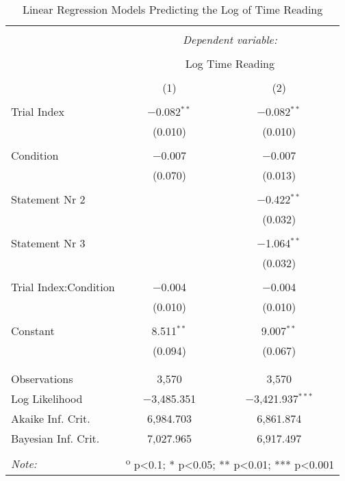
\begin{table} \centering
  \small
  \caption{Linear Regression Models Predicting the Log of Time Reading}
  \label{table:read}
  \renewcommand{\arraystretch}{0.6}
\begin{tabular}{@{\extracolsep{5pt}}lcc}
\\[-1.8ex]\hline
\hline \\[-1.8ex]
 & \multicolumn{2}{c}{\textit{Dependent variable:}} \\
\cline{2-3}
\\[-1.8ex] & \multicolumn{2}{c}{Log Time Reading} \\
\\[-1.8ex] & (1) & (2)\\
\hline \\[-1.8ex]
 Trial Index & $-$0.082$^{**}$ & $-$0.082$^{**}$ \\
  & (0.010) & (0.010) \\
  & & \\
 Condition & $-$0.007 & $-$0.007 \\
  & (0.070) & (0.013) \\
  & & \\
 Statement Nr 2 &  & $-$0.422$^{**}$ \\
  &  & (0.032) \\
  & & \\
 Statement Nr 3 &  & $-$1.064$^{**}$ \\
  &  & (0.032) \\
  & & \\
 Trial Index:Condition & $-$0.004 & $-$0.004 \\
  & (0.010) & (0.010) \\
  & & \\
 Constant & 8.511$^{**}$ & 9.007$^{**}$ \\
  & (0.094) & (0.067) \\
  & & \\
\hline \\[-1.8ex]
Observations & 3,570 & 3,570 \\
Log Likelihood & $-$3,485.351 & $-$3,421.937$^{***}$ \\
Akaike Inf. Crit. & 6,984.703 & 6,861.874 \\
Bayesian Inf. Crit. & 7,027.965 & 6,917.497 \\
\hline
\hline \\[-1.8ex]
\textit{Note:}  & \multicolumn{2}{r}{	\textsuperscript{o} p<0.1; * p<0.05; ** p<0.01; *** p<0.001} \\
\end{tabular}
\end{table}
